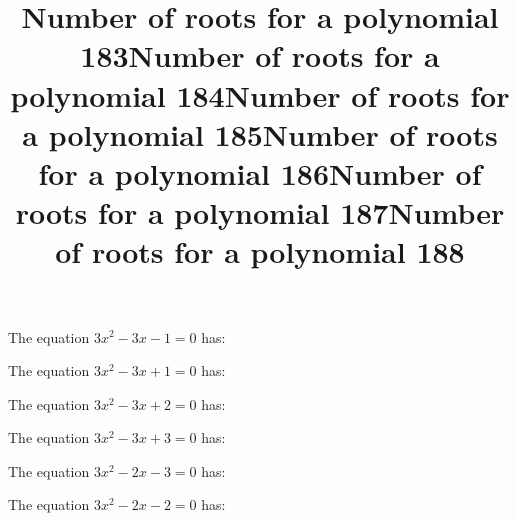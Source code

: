 \documentclass{article}
\begin{document}
\begin{category}
\begin{question}[multichoice]

\end{question}
\begin{question}[multichoice]
\title{Number of roots for a polynomial 183}
The equation $3 x^{2} - 3 x - 1=0$ has:


\end{question}
\begin{question}[multichoice]
\title{Number of roots for a polynomial 184}
The equation $3 x^{2} - 3 x + 1=0$ has:


\end{question}
\begin{question}[multichoice]
\title{Number of roots for a polynomial 185}
The equation $3 x^{2} - 3 x + 2=0$ has:


\end{question}
\begin{question}[multichoice]
\title{Number of roots for a polynomial 186}
The equation $3 x^{2} - 3 x + 3=0$ has:


\end{question}
\begin{question}[multichoice]
\title{Number of roots for a polynomial 187}
The equation $3 x^{2} - 2 x - 3=0$ has:


\end{question}
\begin{question}[multichoice]
\title{Number of roots for a polynomial 188}
The equation $3 x^{2} - 2 x - 2=0$ has:



\end{question}
\end{category}
\end{document}
